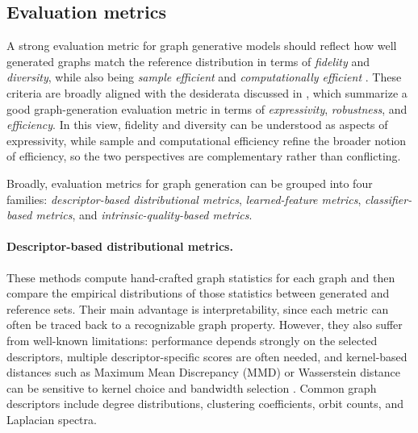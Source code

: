 \documentclass{article}
\begin{document}
\subsection{Evaluation metrics}
\label{subsec:evaluation_metrics}

A strong evaluation metric for graph generative models should reflect how well generated graphs match the reference distribution in terms of \emph{fidelity} and \emph{diversity}, while also being \emph{sample efficient} and \emph{computationally efficient} \cite{thompson2022evaluation}. These criteria are broadly aligned with the desiderata discussed in \cite{obray2022evaluation}, which summarize a good graph-generation evaluation metric in terms of \emph{expressivity}, \emph{robustness}, and \emph{efficiency}. In this view, fidelity and diversity can be understood as aspects of expressivity, while sample and computational efficiency refine the broader notion of efficiency, so the two perspectives are complementary rather than conflicting.

Broadly, evaluation metrics for graph generation can be grouped into four families: \emph{descriptor-based distributional metrics}, \emph{learned-feature metrics}, \emph{classifier-based metrics}, and \emph{intrinsic-quality-based metrics}.

\paragraph{Descriptor-based distributional metrics.}
These methods compute hand-crafted graph statistics for each graph and then compare the empirical distributions of those statistics between generated and reference sets. Their main advantage is interpretability, since each metric can often be traced back to a recognizable graph property. However, they also suffer from well-known limitations: performance depends strongly on the selected descriptors, multiple descriptor-specific scores are often needed, and kernel-based distances such as Maximum Mean Discrepancy (MMD) or Wasserstein distance can be sensitive to kernel choice and bandwidth selection \cite{krimmel2025polygraph}. Common graph descriptors include degree distributions, clustering coefficients, orbit counts, and Laplacian spectra.
\end{document}
